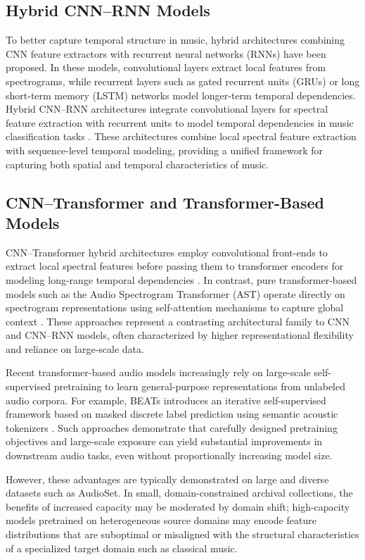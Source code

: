 \subsection{Hybrid CNN--RNN Models}
To better capture temporal structure in music, hybrid architectures combining CNN feature extractors with recurrent neural networks (RNNs) have been proposed. In these models, convolutional layers extract local features from spectrograms, while recurrent layers such as gated recurrent units (GRUs) or long short-term memory (LSTM) networks model longer-term temporal dependencies.
Hybrid CNN–RNN architectures integrate convolutional layers for spectral feature extraction with recurrent units to model temporal dependencies in music classification tasks \cite{lin2024}. 
These architectures combine local spectral feature extraction with sequence-level temporal modeling, providing a unified framework for capturing both spatial and temporal characteristics of music.

\subsection{CNN--Transformer and Transformer-Based Models}

CNN–Transformer hybrid architectures employ convolutional front-ends to extract local spectral features before passing them to transformer encoders for modeling long-range temporal dependencies \cite{pourmoazemi2024}. 
In contrast, pure transformer-based models such as the Audio Spectrogram Transformer (AST) operate directly on spectrogram representations using self-attention mechanisms to capture global context \cite{gong2021ast}. 
These approaches represent a contrasting architectural family to CNN and CNN--RNN models, often characterized by higher representational flexibility and reliance on large-scale data.

Recent transformer-based audio models increasingly rely on large-scale self-supervised pretraining to learn general-purpose representations from unlabeled audio corpora. 
For example, BEATs introduces an iterative self-supervised framework based on masked discrete label prediction using semantic acoustic tokenizers \cite{chen2023beats}. 
Such approaches demonstrate that carefully designed pretraining objectives and large-scale exposure can yield substantial improvements in downstream audio tasks, even without proportionally increasing model size.

However, these advantages are typically demonstrated on large and diverse datasets such as AudioSet. 
In small, domain-constrained archival collections, the benefits of increased capacity may be moderated by domain shift; high-capacity models pretrained on heterogeneous source domains may encode feature distributions that are suboptimal or misaligned with the structural characteristics of a specialized target domain such as classical music.

